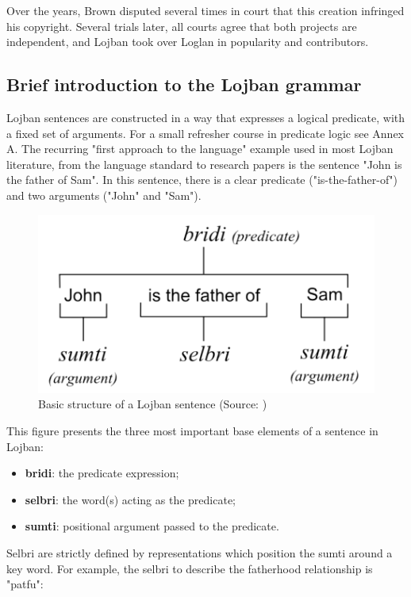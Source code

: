 Over the years, Brown disputed several times in court that this creation infringed his copyright. Several trials later, all courts agree that both projects are independent,
and Lojban took over Loglan in popularity and contributors.

\subsection{Brief introduction to the Lojban grammar}

Lojban sentences are constructed in a way that expresses a logical predicate, with a fixed set of arguments. For a small
refresher course in predicate logic see Annex A. The recurring "first approach to the language" example used in most Lojban
literature, from the language standard to research papers is the sentence "John is the father of Sam". In this sentence, there
is a clear predicate ("is-the-father-of") and two arguments ("John" and "Sam").

\begin{figure}[H]
\centering
\includegraphics[scale=0.20]{images/lojban_grammar.png}
\caption{Basic structure of a Lojban sentence (Source: \cite{cowan1997complete})}
\end{figure}

This figure presents the three most important base elements of a sentence in Lojban:

\begin{itemize}
    \item \textbf{bridi}: the predicate expression;
    \item \textbf{selbri}: the word(s) acting as the predicate;
    \item \textbf{sumti}: positional argument passed to the predicate.
\end{itemize}

Selbri are strictly defined by representations which position the sumti around a key word. For example, the selbri to describe the fatherhood relationship is "patfu":

